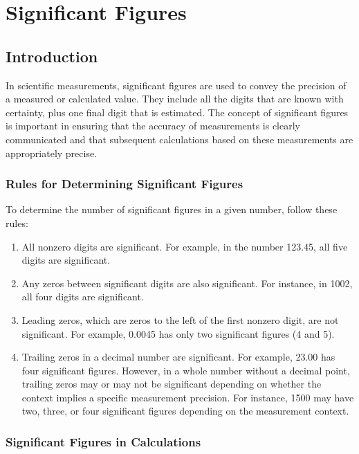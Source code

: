 \documentclass[10pt, roman]{article}
\begin{document}
\section{Significant Figures}
\subsection*{Introduction}

In scientific measurements, significant figures are used to convey the precision of a measured or calculated value.
They include all the digits that are known with certainty, plus one final digit that is estimated.
The concept of significant figures is important in ensuring that the accuracy of measurements is clearly communicated and that subsequent calculations based on these measurements are appropriately precise.

\subsubsection*{Rules for Determining Significant Figures}

To determine the number of significant figures in a given number, follow these rules:
\begin{enumerate}
    \item All nonzero digits are significant.
    For example, in the number 123.45, all five digits are significant.
    \item Any zeros between significant digits are also significant.
    For instance, in 1002, all four digits are significant.
    \item Leading zeros, which are zeros to the left of the first nonzero digit, are not significant.
    For example, 0.0045 has only two significant figures (4 and 5).
    \item Trailing zeros in a decimal number are significant.
    For example, 23.00 has four significant figures.
    However, in a whole number without a decimal point, trailing zeros may or may not be significant depending on whether the context implies a specific measurement precision.
    For instance, 1500 may have two, three, or four significant figures depending on the measurement context.
\end{enumerate}

\subsubsection*{Significant Figures in Calculations}
\end{document}
